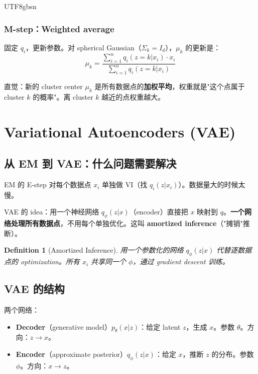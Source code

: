 \documentclass[11pt]{article}
\newtheorem{definition}{Definition}[section]
\begin{document}
\begin{CJK}{UTF8}{gbsn}
\subsubsection{M-step：Weighted average}

固定 $q_i$，更新参数。对 spherical Gaussian（$\Sigma_k = I_d$），$\mu_k$ 的更新是：
\[
  \mu_k = \frac{\sum_{i=1}^{n} q_i(z = k | x_i) \cdot x_i}{\sum_{i=1}^{n} q_i(z = k | x_i)}
\]

直觉：新的 cluster center $\mu_k$ 是所有数据点的\textbf{加权平均}，权重就是"这个点属于 cluster $k$ 的概率"。离 cluster $k$ 越近的点权重越大。

\vspace{0.3em}
\noindent{}

\section{Variational Autoencoders (VAE)}

\subsection{从 EM 到 VAE：什么问题需要解决}

EM 的 E-step 对每个数据点 $x_i$ 单独做 VI（找 $q_i(z|x_i)$）。数据量大的时候太慢。

VAE 的 idea：用一个神经网络 $q_\phi(z|x)$（encoder）直接把 $x$ 映射到 $q$。\textbf{一个网络处理所有数据点}，不用每个单独优化。这叫 \textbf{amortized inference}（"摊销"推断）。

\begin{definition}[Amortized Inference]
用一个参数化的网络 $q_\phi(z|x)$ 代替逐数据点的 optimization。所有 $x_i$ 共享同一个 $\phi$，通过 gradient descent 训练。
\end{definition}

\subsection{VAE 的结构}

两个网络：
\begin{itemize}
  \item \textbf{Decoder}（generative model）$p_\theta(x|z)$：给定 latent $z$，生成 $x$。参数 $\theta$。方向：$z \to x$。
  \item \textbf{Encoder}（approximate posterior）$q_\phi(z|x)$：给定 $x$，推断 $z$ 的分布。参数 $\phi$。方向：$x \to z$。
\end{itemize}


\end{CJK}
\end{document}
